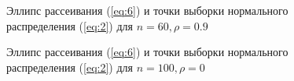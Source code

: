 \documentclass{article}
\begin{document}
\begin{figure}[h]
\caption{Эллипс рассеивания (\ref{eq:6}) и точки выборки нормального распределения (\ref{eq:2})  для $n = 60, \rho = 0.9$}
\end{figure}

\newpage
\begin{figure}[h]
\caption{Эллипс рассеивания (\ref{eq:6}) и точки выборки нормального распределения (\ref{eq:2}) для $n = 100, \rho = 0$}
\end{figure}
\end{document}
